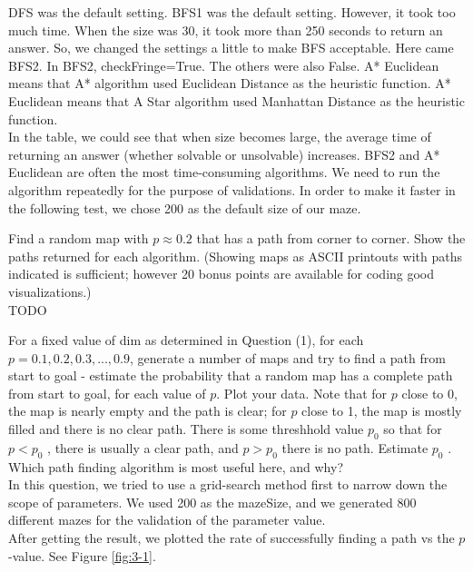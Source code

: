 \documentclass[letter]{article}
\begin{document}
\begin{questions}
	DFS was the default setting. BFS1 was the default setting. However, it took too much time. When the size was 30, it took more than 250 seconds to return an answer. So, we changed the settings a little to make BFS acceptable. Here came BFS2. In BFS2, checkFringe=True. The others were also False. A* Euclidean means that A* algorithm used Euclidean Distance as the heuristic function. A* Euclidean means that A Star algorithm used Manhattan Distance as the heuristic function. \\
	
	In the table, we could see that when size becomes large, the average time of returning an answer (whether solvable or unsolvable) increases. BFS2 and A* Euclidean are often the most time-consuming algorithms. We need to run the algorithm repeatedly for the purpose of validations. In order to make it faster in the following test, we chose 200 as the default size of our maze. \\
	
	\item {Find a random map with $ p \approx 0.2 $ that has a path from corner to corner. Show the paths returned for each algorithm. (Showing maps as ASCII printouts with paths indicated is sufficient; however 20 bonus points are available for coding good visualizations.)} \\
	
	TODO\\
	
	\item {For a fixed value of dim as determined in Question (1), for each $ p = 0.1, 0.2, 0.3, ... , 0.9 $, generate a number of maps and try to find a path from start to goal - estimate the probability that a random map has a complete path from start to goal, for each value of $ p $. Plot your data. Note that for $ p $ close to 0, the map is nearly empty and the path is clear; for $ p $ close to 1, the map is mostly filled and there is no clear path. There is some threshhold value $ p_0 $ so that for $ p < p_0 $ , there is usually a clear path, and $ p > p_0 $ there is no path. Estimate $ p_0 $ . Which path finding algorithm is most useful here, and why?} \\
	
	In this question, we tried to use a grid-search method first to narrow down the scope of parameters. We used 200 as the mazeSize, and we generated 800 different mazes for the validation of the parameter value. \\
	
	After getting the result, we plotted the rate of successfully finding a path vs the $ p $-value. See Figure \ref{fig:3-1}. \\
	

\end{questions}
\end{document}
